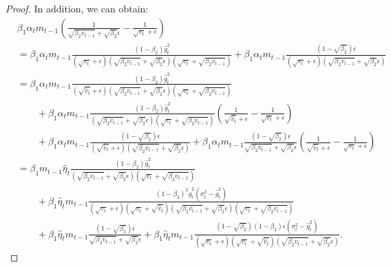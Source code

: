 \begin{proof}
In addition, we can obtain:
\[ 
\begin{split}
& \beta_1\alpha_tm_{t-1}\left(\frac{1}{\sqrt{\beta_2 v_{t-1}}+\sqrt{\beta_2} \epsilon} - \frac{1}{\sqrt{v_t}+\epsilon}\right) \\
&= \beta_1\alpha_tm_{t-1}\frac{\left(1-\beta_2\right)\hat{g}_t^2}{\left(\sqrt{v_t}+\epsilon\right)\left(\sqrt{\beta_2 v_{t-1}} + \sqrt{\beta_2}\epsilon\right)\left(\sqrt{v_t} + \sqrt{\beta_2 v_{t-1}}\right)}
+ \beta_1 \alpha_t m_{t-1} \frac{\left(1-\sqrt{\beta_2}\right)\epsilon}{\left(\sqrt{v_t} + \epsilon\right)\left(\sqrt{\beta_2v_{t-1}} + \sqrt{\beta_2}\epsilon\right)}\\
& = \beta_1\alpha_tm_{t-1}\frac{\left(1-\beta_2\right)\hat{g}_t^2}{\left(\sqrt{\hat{v}_t}+\epsilon\right)\left(\sqrt{\beta_2 v_{t-1}} + \sqrt{\beta_2}\epsilon\right)\left(\sqrt{v_t} + \sqrt{\beta_2 v_{t-1}}\right)} 
\\
&\qquad + \beta_1\alpha_tm_{t-1}\frac{\left(1-\beta_2\right)\hat{g}_t^2}{\left(\sqrt{\beta_2 v_{t-1}} + \sqrt{\beta_2}\epsilon\right)\left(\sqrt{v_t} + \sqrt{\beta_2 v_{t-1}}\right)}\left(\frac{1}{\sqrt{\hat{v}_t} + \epsilon}- \frac{1}{\sqrt{v_t} + \epsilon}\right)\\
&\qquad + \beta_1 \alpha_t m_{t-1} \frac{\left(1-\sqrt{\beta_2}\right)\epsilon}{\left(\sqrt{\hat{v}_t} + \epsilon\right)\left(\sqrt{\beta_2v_{t-1}} + \sqrt{\beta_2}\epsilon\right)} + \beta_1 \alpha_t m_{t-1} \frac{\left(1-\sqrt{\beta_2}\right)\epsilon}{\sqrt{\beta_2v_{t-1}} + \sqrt{\beta_2}\epsilon}\left(\frac{1}{\sqrt{\hat{v}_t} + \epsilon}- \frac{1}{\sqrt{v_t} + \epsilon}\right)\\
& = \beta_1m_{t-1}\hat{\eta}_t\frac{\left(1-\beta_2\right)\hat{g}_t^2}{\left(\sqrt{\beta_2 v_{t-1}} + \sqrt{\beta_2}\epsilon\right)\left(\sqrt{v_t} + \sqrt{\beta_2 v_{t-1}}\right)}\\
& \qquad + \beta_1\hat{\eta}_tm_{t-1}\frac{(1-\beta_2)^2\hat{g}_t^2(\sigma_t^2 -\hat{g}_t^2)}{(\sqrt{v_t}+\epsilon)(\sqrt{v_t} + \sqrt{\hat{v}_t})(\sqrt{\beta_2v_{t-1}} +\sqrt{\beta_2}\epsilon)(\sqrt{v_t} + \sqrt{\beta_2v_{t-1}})}
\\&\qquad  + \beta_1 \hat{\eta}_t  m_{t-1}\frac{(1-\sqrt{\beta_2})\epsilon}{\sqrt{\beta_2 v_{t-1}} + \sqrt{\beta_2}\epsilon} + \beta_1\hat{\eta}_tm_{t-1}\frac{(1-\sqrt{\beta_2})(1-\beta_2)\epsilon(\sigma_t^2 - \hat{g}_t^2)}{(\sqrt{v_t} + \epsilon)(\sqrt{v_t} + \sqrt{\hat{v}_t})(\sqrt{\beta_2v_{t-1}} + \sqrt{\beta_2}\epsilon)} .
\end{split}
\]


\end{proof}
